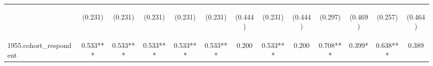 \begin{center}
\begin{tabular}{lcccccccccccc}
\vspace{4pt} & \begin{footnotesize}(0.231)\end{footnotesize} & \begin{footnotesize}(0.231)\end{footnotesize} & \begin{footnotesize}(0.231)\end{footnotesize} & \begin{footnotesize}(0.231)\end{footnotesize} & \begin{footnotesize}(0.231)\end{footnotesize} & \begin{footnotesize}(0.444)\end{footnotesize} & \begin{footnotesize}(0.231)\end{footnotesize} & \begin{footnotesize}(0.444)\end{footnotesize} & \begin{footnotesize}(0.297)\end{footnotesize} & \begin{footnotesize}(0.469)\end{footnotesize} & \begin{footnotesize}(0.257)\end{footnotesize} & \begin{footnotesize}(0.464)\end{footnotesize} \\
1955.cohort\_respondent & 0.533*** & 0.533*** & 0.533*** & 0.533*** & 0.533*** & 0.200 & 0.533*** & 0.200 & 0.708*** & 0.399* & 0.638*** & 0.389 \\

\end{tabular}
\end{center}
